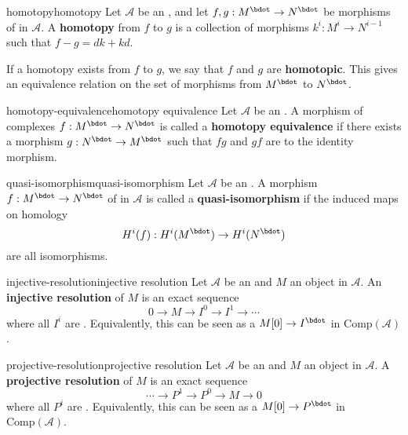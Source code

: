 \begin{topic}{homotopy}{homotopy}
    Let $\mathcal{A}$ be an , and let $f, g : M^\bdot \to N^\bdot$ be morphisms of  in $\mathcal{A}$. A \textbf{homotopy} from $f$ to $g$ is a collection of morphisms $k^i : M^i \to N^{i - 1}$ such that $f - g = dk + kd$.
    
    If a homotopy exists from $f$ to $g$, we say that $f$ and $g$ are \textbf{homotopic}. This gives an equivalence relation on the set of morphisms from $M^\bdot$ to $N^\bdot$.
\end{topic}

\begin{topic}{homotopy-equivalence}{homotopy equivalence}
    Let $\mathcal{A}$ be an . A morphism of complexes $f : M^\bdot \to N^\bdot$ is called a \textbf{homotopy equivalence} if there exists a morphism $g : N^\bdot \to M^\bdot$ such that $fg$ and $gf$ are  to the identity morphism.
\end{topic}

\begin{topic}{quasi-isomorphism}{quasi-isomorphism}
    Let $\mathcal{A}$ be an . A morphism $f : M^\bdot \to N^\bdot$ of  in $\mathcal{A}$ is called a \textbf{quasi-isomorphism} if the induced maps on homology
    \[ H^i(f) : H^i(M^\bdot) \to H^i(N^\bdot) \]
    are all isomorphisms.
\end{topic}

\begin{topic}{injective-resolution}{injective resolution}
    Let $\mathcal{A}$ be an  and $M$ an object in $\mathcal{A}$. An \textbf{injective resolution} of $M$ is an exact sequence
    \[ 0 \to M \to I^0 \to I^1 \to \cdots \]
    where all $I^i$ are . Equivalently, this can be seen as a  $M[0] \to I^\bdot$ in $\text{Comp}(\mathcal{A})$.
\end{topic}

\begin{topic}{projective-resolution}{projective resolution}
    Let $\mathcal{A}$ be an  and $M$ an object in $\mathcal{A}$. A \textbf{projective resolution} of $M$ is an exact sequence
    \[ \cdots \to P^1 \to P^0 \to M \to 0 \]
    where all $P^i$ are . Equivalently, this can be seen as a  $M[0] \to P^\bdot$ in $\text{Comp}(\mathcal{A})$.
\end{topic}

